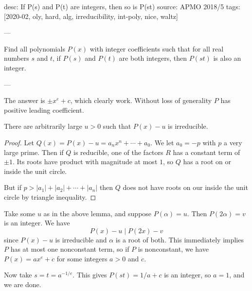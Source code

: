 desc: If P(s) and P(t) are integers, then so is P(st)
source: APMO 2018/5
tags: [2020-02, oly, hard, alg, irreducibility, int-poly, nice, waltz]

---

Find all polynomials $P(x)$ with integer coefficients such that for all real numbers $s$ and $t$, if $P(s)$ and $P(t)$ are both integers, then $P(st)$ is also an integer.

---

The answer is $\pm x^e+c$, which clearly work. Without loss of generality $P$ has positive leading coefficient.
\begin{lemma*}[MOP 2007]
    There are arbitrarily large $u>0$ such that $P(x)-u$ is irreducible.
\end{lemma*}
\begin{proof}
    Let $Q(x)=P(x)-u=a_nx^n+\cdots+a_0$. We let $a_0=-p$ with $p$ a very large prime. Then if $Q$ is reducible, one of the factors $R$ has a constant term of $\pm1$. Its roots have product with magnitude at most $1$, so $Q$ has a root on or inside the unit circle.

    But if $p>|a_1|+|a_2|+\cdots+|a_n|$ then $Q$ does not have roots on our inside the unit circle by triangle inequality.
\end{proof}

Take some $u$ as in the above lemma, and suppose $P(\alpha)=u$. Then $P(2\alpha)=v$ is an integer. We have \[P(x)-u\mid P(2x)-v\]
since $P(x)-u$ is irreducible and $\alpha$ is a root of both. This immediately implies $P$ has at most one nonconstant term, so if $P$ is nonconstant, we have $P(x)=ax^e+c$ for some integers $a>0$ and $c$.

Now take $s=t=a^{-1/e}$. This gives $P(st)=1/a+c$ is an integer, so $a=1$, and we are done.
